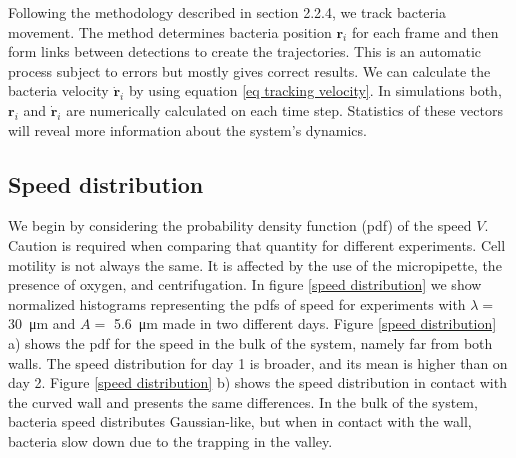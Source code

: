 Following the methodology described in section 2.2.4, we track bacteria movement. The method determines bacteria position $\textbf{r}_i$ for each frame and then form links between detections to create the trajectories. This is an automatic process subject to errors but mostly gives correct results. We can calculate the bacteria velocity $\dot{\textbf{r}}_i$ by using equation \eqref{eq tracking velocity}. In simulations both, $\textbf{r}_i$ and $\dot{\textbf{r}}_i$ are numerically calculated on each time step. Statistics of these vectors will reveal more information about the system's dynamics.


\subsection{Speed distribution}

We begin by considering the probability density function (pdf) of the speed $V$. Caution is required when comparing that quantity for different experiments. Cell motility is not always the same. It is affected by the use of the micropipette, the presence of oxygen, and centrifugation. In figure \ref{speed distribution} we show normalized histograms representing the pdfs of speed for experiments with $\lambda=$ \SI{30}{\micro\meter} and $A=$ \SI{5.6}{\micro\meter} made in two different days. Figure \ref{speed distribution} a) shows the pdf for the speed in the bulk of the system, namely far from both walls. The speed distribution for day 1 is broader, and its mean is higher than on day 2. Figure \ref{speed distribution} b) shows the speed distribution in contact with the curved wall and presents the same differences. In the bulk of the system, bacteria speed distributes Gaussian-like, but when in contact with the wall, bacteria slow down due to the trapping in the valley.


